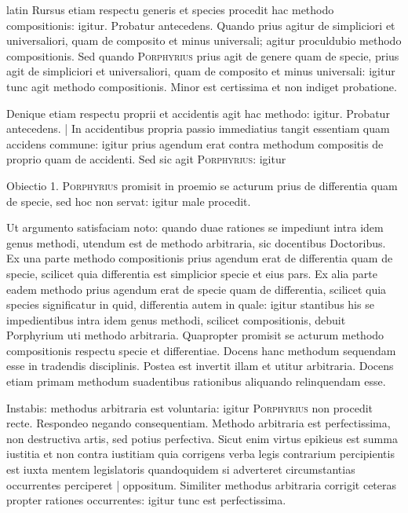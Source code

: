 \begin{otherlanguage*}{latin}
\pstart
  Rursus etiam respectu generis et species procedit hac methodo compositionis: igitur. Probatur antecedens. Quando prius agitur de simpliciori et universaliori, quam de composito et minus universali; agitur proculdubio methodo compositionis. Sed quando \textsc{Porphyrius} prius agit de genere quam de specie, prius agit de simpliciori et universaliori, quam de composito et minus universali: igitur tunc agit methodo compositionis. Minor est certissima et non indiget probatione. 
\pend

\pstart
  Denique etiam respectu proprii et accidentis agit hac methodo: igitur. Probatur antecedens. \textnormal{|}   In accidentibus propria passio immediatius tangit essentiam quam accidens commune: igitur prius agendum erat contra methodum compositis de proprio quam de accidenti. Sed sic agit \textsc{Porphyrius}: igitur 
\pend

\pstart
  Obiectio 1. \textsc{Porphyrius} promisit in proemio se acturum prius de differentia quam de specie, sed hoc non servat: igitur male procedit. 
\pend

\pstart
  Ut argumento satisfaciam noto: quando duae rationes se impediunt intra idem genus methodi, utendum est de methodo arbitraria, sic docentibus Doctoribus. Ex una parte methodo compositionis prius agendum erat de differentia quam de specie, scilicet quia differentia est simplicior specie et eius pars. Ex alia parte eadem methodo prius agendum erat de specie quam de differentia, scilicet quia species significatur in quid, differentia autem in quale: igitur stantibus his se impedientibus intra idem genus methodi, scilicet compositionis, debuit Porphyrium uti methodo arbitraria. Quapropter promisit se acturum methodo compositionis respectu specie et differentiae. Docens hanc methodum sequendam esse in tradendis disciplinis. Postea est invertit illam et utitur arbitraria. Docens etiam primam methodum suadentibus rationibus aliquando relinquendam esse. 
\pend

\pstart
  Instabis: methodus arbitraria est voluntaria: igitur \textsc{Porphyrius} non procedit recte. Respondeo negando consequentiam. Methodo arbitraria est perfectissima, non destructiva artis, sed potius perfectiva. Sicut enim virtus epikieus est summa iustitia et non contra iustitiam quia corrigens verba legis contrarium percipientis est iuxta mentem legislatoris quandoquidem si adverteret circumstantias occurrentes perciperet \textnormal{|} oppositum. Similiter methodus arbitraria corrigit ceteras propter rationes occurrentes: igitur tunc est perfectissima. 
\pend


\end{otherlanguage*}
